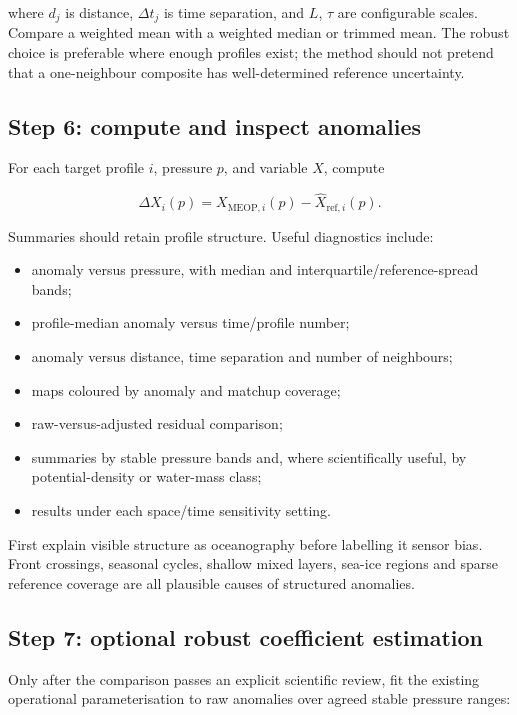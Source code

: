 \documentclass[11pt,a4paper]{article}
\begin{document}
where \(d_j\) is distance, \(\Delta t_j\) is time separation, and \(L\), \(\tau\) are
configurable scales. Compare a weighted mean with a weighted median or trimmed mean.
The robust choice is preferable where enough profiles exist; the method should not
pretend that a one-neighbour composite has well-determined reference uncertainty.

\subsection{Step 6: compute and inspect anomalies}

For each target profile \(i\), pressure \(p\), and variable \(X\), compute

\begin{equation}
\Delta X_i(p)=X_{\mathrm{MEOP},i}(p)-\widehat{X}_{\mathrm{ref},i}(p).
\end{equation}

Summaries should retain profile structure. Useful diagnostics include:

\begin{itemize}[leftmargin=1.5em]
  \item anomaly versus pressure, with median and interquartile/reference-spread bands;
  \item profile-median anomaly versus time/profile number;
  \item anomaly versus distance, time separation and number of neighbours;
  \item maps coloured by anomaly and matchup coverage;
  \item raw-versus-adjusted residual comparison;
  \item summaries by stable pressure bands and, where scientifically useful, by
  potential-density or water-mass class;
  \item results under each space/time sensitivity setting.
\end{itemize}

First explain visible structure as oceanography before labelling it
sensor bias. Front crossings, seasonal cycles, shallow mixed layers, sea-ice regions and
sparse reference coverage are all plausible causes of structured anomalies.

\subsection{Step 7: optional robust coefficient estimation}

Only after the comparison passes an explicit scientific review, fit the existing
operational parameterisation to raw
anomalies over agreed stable pressure ranges:
\end{document}
